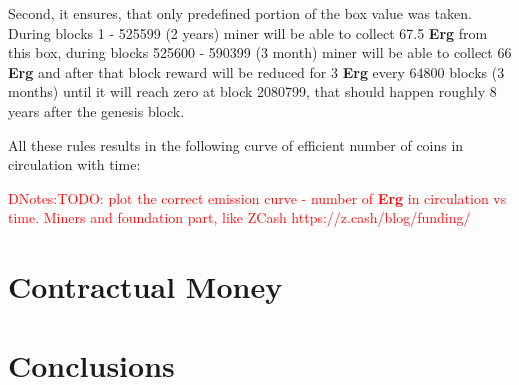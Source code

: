 \documentclass[]{article}
\newcommand{\dnote}[1]{{\textcolor{red}{DNotes:{#1}}}}
\newcommand{\Erg}{\textbf{Erg}}
\begin{document}
\begin{itemize}
        Second, it ensures, that only predefined portion of the box value was taken.
        During blocks 1 - 525599 (2 years) miner will be able to collect 67.5 \Erg{} from this box,
        during blocks 525600 - 590399 (3 month) miner will be able to collect 66 \Erg{} and after
        that block reward will be reduced for 3 \Erg{} every 64800 blocks (3 months) until it will reach zero
        at block 2080799, that should happen roughly 8 years after the genesis block.


    \end{itemize}

    All these rules results in the following curve of efficient number of coins in circulation with time:

    \dnote{TODO: plot the correct emission curve - number of \Erg{} in circulation vs time. Miners and foundation part, like ZCash https://z.cash/blog/funding/}


    \section{Contractual Money}
    \label{sec:contractual}



    \section{Conclusions}

    
\end{document}

